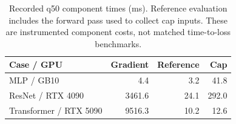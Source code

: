 \begin{table}[!t]
\caption{Recorded q50 component times (ms). Reference evaluation includes the forward pass used to collect cap inputs. These are instrumented component costs, not matched time-to-loss benchmarks.}
\label{tab:app-cost}
\centering\small
\setlength{\tabcolsep}{4pt}
\begin{tabular}{lrrr}
\toprule
Case / GPU & Gradient & Reference & Cap \\
\midrule
MLP / GB10 & 4.4 & 3.2 & 41.8 \\
ResNet / RTX 4090 & 3461.6 & 24.1 & 292.0 \\
Transformer / RTX 5090 & 9516.3 & 10.2 & 12.6 \\
\bottomrule
\end{tabular}
\end{table}

